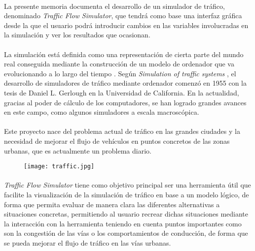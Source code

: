 \paragraph{}
La presente memoria documenta el desarrollo de un simulador de tráfico, denominado \emph{Traffic Flow Simulator}, que tendrá como base una interfaz gráfica desde la que el usuario podrá introducir cambios en las variables involucradas en la simulación y ver los resultados que ocasionan.

\paragraph{}
La simulación está definida como una representación de cierta parte del mundo real conseguida mediante la construcción de un modelo de ordenador que va evolucionando a lo largo del tiempo \cite{Drew1968}. Según \emph{Simulation of traffic systems} \cite{Pursula}, el desarrollo de simuladores de tráfico mediante ordenador comenzó en 1955 con la tesis de Daniel L. Gerlough en la Universidad de California. En la actualidad, gracias al poder de cálculo de los computadores, se han logrado grandes avances en este campo, como algunos simuladores a escala macroscópica.

\paragraph{}
Este proyecto nace del problema actual de tráfico en las grandes ciudades y la necesidad de mejorar el flujo de vehículos en puntos concretos de las zonas urbanas, que es actualmente un problema diario. 

	\begin{figure}[ht]
		\centering
			\texttt{[image: traffic.jpg]}
	\end{figure}

\paragraph{}
\emph{Traffic Flow Simulator} tiene como objetivo principal ser una herramienta útil que facilite la visualización de la simulación de tráfico en base a un modelo lógico, de forma que permita evaluar de manera clara las diferentes alternativas a situaciones concretas, permitiendo al usuario recrear dichas situaciones mediante la interacción con la herramienta teniendo en cuenta puntos importantes como son la congestión de las vías o los comportamientos de conducción, de forma que se pueda mejorar el flujo de tráfico en las vías urbanas.

